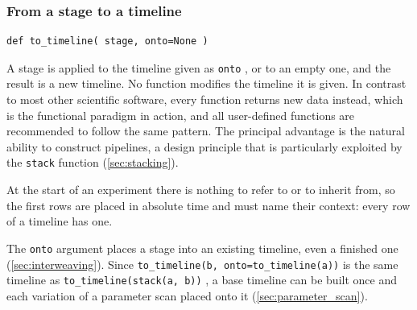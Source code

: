 \documentclass{SciPost}
\newcommand{\python}[1]{%
  \texttt{#1}%
}
\begin{document}
\subsubsection{From a stage to a timeline}
\label{sec:to_timeline}
%
\begin{verbatim}
def to_timeline( stage, onto=None )
\end{verbatim}
%
A stage is applied to the timeline given as \python{onto}, or to an empty one, and the result is a new timeline. No function modifies the timeline it is given. In contrast to most other scientific software, every function returns new data instead, which is the functional paradigm in action, and all user-defined functions are recommended to follow the same pattern. The principal advantage is the natural ability to construct pipelines, a design principle that is particularly exploited by the \python{stack} function (\cref{sec:stacking}).

At the start of an experiment there is nothing to refer to or to inherit from, so the first rows are placed in absolute time and must name their context: every row of a timeline has one.

The \python{onto} argument places a stage into an existing timeline, even a finished one (\cref{sec:interweaving}). Since \python{to_timeline(b, onto=to_timeline(a))} is the same timeline as \python{to_timeline(stack(a, b))}, a base timeline can be built once and each variation of a parameter scan placed onto it (\cref{sec:parameter_scan}).
\end{document}

